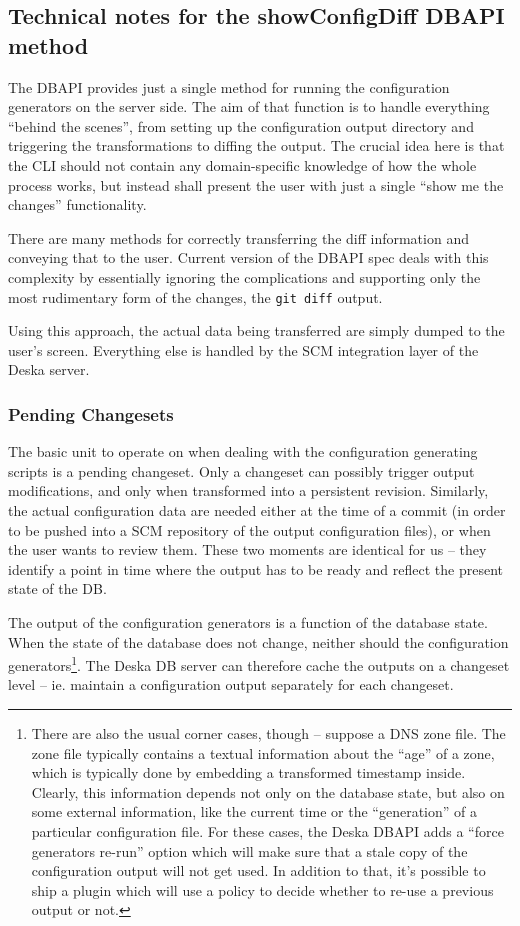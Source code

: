 \documentclass{article}
\begin{document}
\subsection{Technical notes for the showConfigDiff DBAPI method}

The DBAPI provides just a single method for running the configuration generators on the server side.  The aim of that
function is to handle everything ``behind the scenes'', from setting up the configuration output directory and
triggering the transformations to diffing the output.  The crucial idea here is that the CLI should not contain any
domain-specific knowledge of how the whole process works, but instead shall present the user with just a single ``show
me the changes'' functionality.

There are many methods for correctly transferring the diff information and conveying that to the user.  Current version
of the DBAPI spec deals with this complexity by essentially ignoring the complications and supporting only the most
rudimentary form of the changes, the {\tt git diff} output.

Using this approach, the actual data being transferred are simply dumped to the user's screen.  Everything else is
handled by the SCM integration layer of the Deska server.

\subsubsection{Pending Changesets}

The basic unit to operate on when dealing with the configuration generating scripts is a pending changeset.  Only a
changeset can possibly trigger output modifications, and only when transformed into a persistent revision.  Similarly,
the actual configuration data are needed either at the time of a commit (in order to be pushed into a SCM repository of
the output configuration files), or when the user wants to review them.  These two moments are identical for us -- they
identify a point in time where the output has to be ready and reflect the present state of the DB.

The output of the configuration generators is a function of the database state.  When the state of the database does not
change, neither should the configuration generators\footnote{There are also the usual corner cases, though -- suppose a
DNS zone file.  The zone file typically contains a textual information about the ``age'' of a zone, which is typically
done by embedding a transformed timestamp inside.  Clearly, this information depends not only on the database state, but
also on some external information, like the current time or the ``generation'' of a particular configuration file.  For
these cases, the Deska DBAPI adds a ``force generators re-run'' option which will make sure that a stale copy of the
configuration output will not get used.  In addition to that, it's possible to ship a plugin which will use a policy to
decide whether to re-use a previous output or not.}.  The Deska DB server can therefore cache the outputs on a changeset
level -- ie. maintain a configuration output separately for each changeset.
\end{document}
